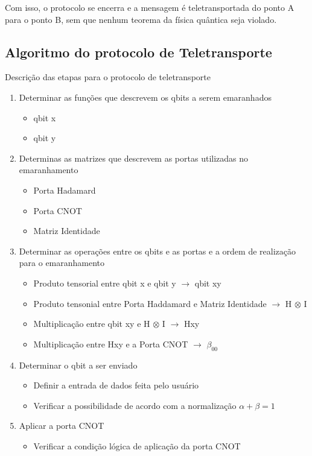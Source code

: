 \documentclass[11pt,oneside,brazil,hidelinks,article,sumario=tradicional,a4paper]{abntex2}
\begin{document}
Com isso, o protocolo se encerra e a mensagem é teletransportada do ponto A para o ponto B, sem que nenhum teorema da física quântica seja violado.


\subsection{Algoritmo do protocolo de Teletransporte}

Descrição das etapas para o protocolo de teletransporte

\begin{enumerate}
\item Determinar as funções que descrevem os qbits a serem emaranhados
	\begin{itemize}
	\item qbit x
	\item qbit y
	\end{itemize}
\item Determinas as matrizes que descrevem as portas utilizadas no emaranhamento
	\begin{itemize}
	\item Porta Hadamard
	\item Porta CNOT
	\item Matriz Identidade
	\end{itemize}
\item Determinar as operações entre os qbits e as portas e a ordem de realização para o emaranhamento
	\begin{itemize}
	\item Produto tensorial entre qbit x e qbit y $\rightarrow$ qbit xy
	\item Produto tensonial entre Porta Haddamard e Matriz Identidade $\rightarrow$ H $\otimes$ I
	\item Multiplicação entre qbit xy e H $\otimes$ I $\rightarrow$ Hxy
	\item Multiplicação entre Hxy e a Porta CNOT $\rightarrow$ $\beta _00$
	\end{itemize}
\item Determinar o qbit a ser enviado
	\begin{itemize}
	\item Definir a entrada de dados feita pelo usuário
	\item Verificar a possibilidade de acordo com a normalização $\alpha + \beta =1$
	\end{itemize}
\item Aplicar a porta CNOT
	\begin{itemize}
	\item Verificar a condição lógica de aplicação da porta CNOT

\end{itemize}
\end{enumerate}
\end{document}
